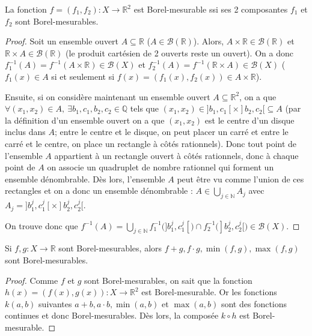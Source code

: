 \begin{theo}
    La fonction $f=(f_1,f_2):X\to\mathbb{R}^2$ est Borel-mesurable ssi ses 2 composantes $f_1$ et $f_2$ sont Borel-mesurables.
\end{theo}
\begin{proof}
    Soit un ensemble ouvert $A\subseteq\mathbb{R}$ ($A\in\mathscr{B}(\mathbb{R})$). Alors, $A\times \mathbb{R}\in\mathscr{B}(\mathbb{R})$ et $\mathbb{R}\times A\in\mathscr{B}(\mathbb{R})$ (le produit cartésien de 2 ouverts reste un ouvert). On a donc $f_1^{-1}(A) = f^{-1}(A\times\mathbb{R})\in\mathscr{B}(X)$ et $f_2^{-1}(A) = f^{-1}(\mathbb{R}\times A)\in\mathscr{B}(X)$ ($f_1(x)\in A$ si et seulement si $f(x)=(f_1(x),f_2(x))\in A\times\mathbb{R}$).
    
    Ensuite, si on considère maintenant un ensemble ouvert $A\subseteq \mathbb{R}^2$, on a que $\forall (x_1,x_2)\in A,\ \exists b_1,c_1,b_2,c_2\in\mathbb{Q}$ tels que $(x_1,x_2)\in]b_1,c_1[\times]b_2,c_2[\subseteq A$ (par la définition d'un ensemble ouvert on a que $(x_1,x_2)$ est le centre d'un disque inclus dans $A$; entre le centre et le disque, on peut placer un carré et entre le carré et le centre, on place un rectangle à côtés rationnels). Donc tout point de l'ensemble $A$ appartient à un rectangle ouvert à côtés rationnels, donc à chaque point de $A$ on associe un quadruplet de nombre rationnel qui forment un ensemble dénombrable. Dès lors, l'ensemble $A$ peut être vu comme l'union de ces rectangles et on a donc un ensemble dénombrable : $A\in\bigcup_{j\in\mathbb{N}}A_j$ avec $A_j=]b_1^j,c_1^j[\times]b_2^j,c_2^j[$.
    
    On trouve donc que $f^{-1}(A)=\bigcup_{j\in\mathbb{N}}f_1^{-1}\big(]b_1^j,c_1^j[\big)\cap f_2^{-1}\big(]b_2^j,c_2^j[\big)\in\mathscr{B}(X)$.
\end{proof}

\begin{theo}
    Si $f,g:X\to\mathbb{R}$ sont Borel-mesurables, alors $f+g,f\cdot g,\min(f,g),\max(f,g)$ sont Borel-mesurables.
\end{theo}
\begin{proof}
    Comme $f$ et $g$ sont Borel-mesurables, on sait que la fonction $h(x)=(f(x),g(x)):X\to\mathbb{R}^2$ est Borel-mesurable. Or les fonctions $k(a,b)$ suivantes $a+b,a\cdot b,\min(a,b)$ et $\max(a,b)$ sont des fonctions continues et donc Borel-mesurables. Dès lors, la composée $k\circ h$ est Borel-mesurable.
\end{proof}

